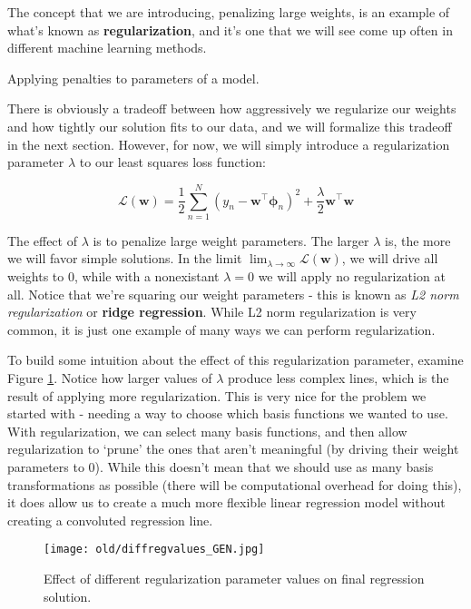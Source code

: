 The concept that we are introducing, penalizing large weights, is an example of what's known as \textbf{regularization}, and it's one that we will see come up often in different machine learning methods.

\begin{definition}[regularization]
    Applying penalties to parameters of a model.
\end{definition}

There is obviously a tradeoff between how aggressively we regularize our weights and how tightly our solution fits to our data, and we will formalize this tradeoff in the next section. However, for now, we will simply introduce a regularization parameter $\lambda$ to our least squares loss function:

\begin{equation} \label{least-squares-loss-fn-w-regularization}
    \mathcal{L}(\mathbf{w}) = \frac{1}{2} \sum_{n=1}^{N} (y_n - \mathbf{w}^\top\boldsymbol{\phi}_n)^2 + \frac{\lambda}{2}\mathbf{w}^{\top}\mathbf{w}
\end{equation}

The effect of $\lambda$ is to penalize large weight parameters. The larger $\lambda$ is, the more we will favor simple solutions. In the limit $\lim_{\lambda\to\infty} \mathcal{L}(\mathbf{w})$, we will drive all weights to 0, while with a nonexistant $\lambda = 0$ we will apply no regularization at all. Notice that we're squaring our weight parameters - this is known as \textit{L2 norm regularization} or \textbf{ridge regression}. While L2 norm regularization is very common, it is just one example of many ways we can perform regularization.

To build some intuition about the effect of this regularization parameter, examine Figure \ref{fig:ridge-reg-diff-values}. Notice how larger values of $\lambda$ produce less complex lines, which is the result of applying more regularization. This is very nice for the problem we started with - needing a way to choose which basis functions we wanted to use. With regularization, we can select many basis functions, and then allow regularization to `prune' the ones that aren't meaningful (by driving their weight parameters to 0). While this doesn't mean that we should use as many basis transformations as possible (there will be computational overhead for doing this), it does allow us to create a much more flexible linear regression model without creating a convoluted regression line.

\begin{figure}
    \centering
    \texttt{[image: old/diffregvalues\_GEN.jpg]}
    \caption{Effect of different regularization parameter values on final regression solution.}
    \label{fig:ridge-reg-diff-values}
\end{figure}


